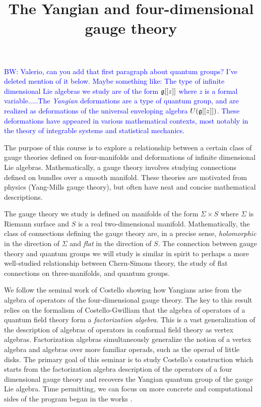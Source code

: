 \documentclass[10pt]{article}
\title{The Yangian and four-dimensional gauge theory}
\date{}
\def\brian{\textcolor{blue}{BW: }\textcolor{blue}}
\begin{document}
\maketitle

\brian{Valerio, can you add that first paragraph about quantum groups? I've deleted mention of it below. Maybe something like: The type of infinite dimensional Lie algebras we study are of the form $\mathfrak g[[z]]$ where $z$ is a formal variable.....The {\em Yangian} deformations are a type of quantum group, and are realized as deformations of the universal enveloping algebra $U(\mathfrak g[[z]])$. These deformations have appeared in various mathematical contexts, most notably in the theory of integrable systems and statistical mechanics.}

The purpose of this course is to explore a relationship between a certain class of gauge theories defined on four-manifolds and deformations of infinite dimensional Lie algebras. 
Mathematically, a gauge theory involves studying connections defined on bundles over a smooth manifold. 
These theories are motivated from physics (Yang-Mills gauge theory), but often have neat and concise mathematical descriptions. 

The gauge theory we study is defined on manifolds of the form $\Sigma \times S$ where $\Sigma$ is Riemann surface and $S$ is a real two-dimensional manifold. 
Mathematically, the class of connections defining the gauge theory are, in a precise sense, {\em holomorphic} in the direction of $\Sigma$ and {\em flat} in the direction of $S$.  
The connection between gauge theory and quantum groups we will study is similar in spirit to perhaps a more well-studied relationship between Chern-Simons theory, the study of flat connections on three-manifolds, and quantum groups.

We follow the seminal work of Costello \cite{CosInt, CosYangian} showing how Yangians arise from the algebra of operators of the four-dimensional gauge theory.
The key to this result relies on the formalism of Costello-Gwilliam \cite{CG1,CG2} that the algebra of operators of a quantum field theory form a {\em factorization algebra}.  
This is a vast generalization of the description of algebras of operators in conformal field theory as vertex algebras. 
Factorization algebras simultaneously generalize the notion of a vertex algebra and algebras over more familiar operads, such as the operad of little disks. 
The primary goal of this seminar is to study Costello's construction which starts from the factorization algebra description of the operators of a four dimensional gauge theory and recovers the Yangian quantum group of the gauge Lie algebra. 
Time permitting, we can focus on more concrete and computational sides of the program began in the works \cite{CWY1, CWY2}.
\end{document}

